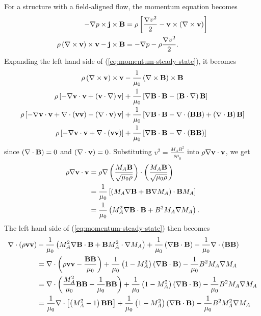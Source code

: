 For a structure with a field-aligned flow, the momentum equation becomes
\begin{equation}
    \begin{split}
        -\nabla p \times \mathbf{j}\times\mathbf{B} &= \rho\left[ \frac{\nabla v^2}{2} - \mathbf{v}\times\left( \nabla \times\mathbf{v} \right) \right] \\
        \rho\left( \nabla \times\mathbf{v} \right)\times\mathbf{v} - \mathbf{j}\times\mathbf{B} &= -\nabla p -\rho\frac{\nabla v^2}{2}. \\
    \end{split}
    \label{eq:momentum-steady-state}
\end{equation}
Expanding the left hand side of (\ref{eq:momentum-steady-state}), it becomes
\[
\begin{split}
    \rho\left( \nabla \times\mathbf{v} \right)\times\mathbf{v} &- \frac{1}{\mu_0}\left( \nabla \times\mathbf{B} \right)\times\mathbf{B} \\
    \rho \left[ -\nabla\mathbf{v}\cdot\mathbf{v} + \left( \mathbf{v}\cdot\nabla \right)\mathbf{v} \right] &+ \frac{1}{\mu_0}\left[ \nabla\mathbf{B}\cdot\mathbf{B} - \left( \mathbf{B}\cdot\nabla \right)\mathbf{B} \right] \\
    \rho \left[ -\nabla\mathbf{v}\cdot\mathbf{v} + \nabla \cdot\left( \mathbf{v}\mathbf{v} \right) -\left( \nabla \cdot\mathbf{v} \right)\mathbf{v} \right] &+ \frac{1}{\mu_0}\left[ \nabla\mathbf{B}\cdot\mathbf{B} - \nabla \cdot\left( \mathbf{B}\mathbf{B} \right) + \left( \nabla \cdot\mathbf{B} \right) \mathbf{B} \right] \\
    \rho \left[ -\nabla\mathbf{v}\cdot\mathbf{v} + \nabla \cdot\left( \mathbf{v}\mathbf{v} \right) \right] &+ \frac{1}{\mu_0}\left[ \nabla\mathbf{B}\cdot\mathbf{B} - \nabla \cdot\left( \mathbf{B}\mathbf{B} \right) \right] \\
\end{split}
\]
since $\left( \nabla \cdot\mathbf{B} \right)=0$ and $\left( \nabla \cdot\mathbf{v} \right)=0$. Substituting $v^2 = \frac{M_A B^2}{\rho\mu_0}$ into $\rho\nabla\mathbf{v}\cdot\mathbf{v}$, we get
\[
\begin{split}
    \rho\nabla\mathbf{v}\cdot\mathbf{v} &= \rho\nabla\left( \frac{M_A \mathbf{B}}{\sqrt{\mu_0\rho}} \right)\cdot\left( \frac{M_A \mathbf{B}}{\sqrt{\mu_0\rho}} \right) \\
    &= \frac{1}{\mu_0}\left[ \left( M_A\nabla\mathbf{B} + \mathbf{B}\nabla M_A \right)\cdot\mathbf{B} M_A \right] \\
    &= \frac{1}{\mu_0}\left( M_A^2\nabla\mathbf{B}\cdot\mathbf{B} + B^2 M_A\nabla M_A \right). \\
\end{split}
\]
The left hand side of (\ref{eq:momentum-steady-state}) then becomes
\[
\begin{split}
    \nabla \cdot\left( \rho\mathbf{v}\mathbf{v} \right) &- \frac{1}{\mu_0}\left( M_A^2\nabla\mathbf{B}\cdot\mathbf{B} + \mathbf{B} M_A^2\cdot\nabla M_A \right) + \frac{1}{\mu_0}\left( \nabla\mathbf{B}\cdot\mathbf{B} \right) - \frac{1}{\mu_0}\nabla \cdot\left( \mathbf{B}\mathbf{B} \right) \\
    &= \nabla \cdot\left( \rho\mathbf{v}\mathbf{v} - \frac{\mathbf{B}\mathbf{B}}{\mu_0} \right) + \frac{1}{\mu_0}\left( 1-M_A^2 \right)\left( \nabla\mathbf{B}\cdot\mathbf{B} \right) - \frac{1}{\mu_0}B^2 M_A\nabla M_A \\
    &= \nabla \cdot\left( \frac{M_A^2}{\mu_0}\mathbf{B}\mathbf{B} - \frac{1}{\mu_0}\mathbf{B}\mathbf{B} \right) + \frac{1}{\mu_0}\left( 1-M_A^2 \right)\left( \nabla\mathbf{B}\cdot\mathbf{B} \right) - \frac{1}{\mu_0}B^2M_A\nabla M_A \\
    &= \frac{1}{\mu_0}\nabla \cdot\left[ \left( M_A^2-1 \right)\mathbf{B}\mathbf{B} \right] + \frac{1}{\mu_0}\left( 1-M_A^2 \right)\left( \nabla\mathbf{B}\cdot\mathbf{B} \right) - \frac{1}{\mu_0}B^2 M_A^2\nabla M_A \\
\end{split}
\]
